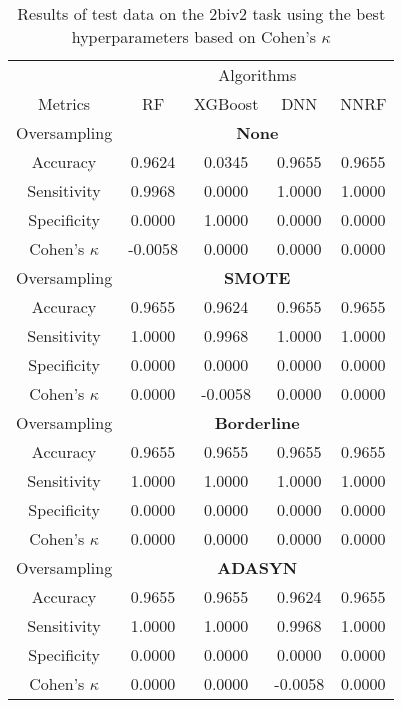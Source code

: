 \begin{table}[!htb]
\centering
\caption{Results of test data on the 2biv2 task using the best hyperparameters based on Cohen's $\kappa$}
\label{tab:2biv2_test_results}
\begin{tabular}{c | c c c c}
\hline
 & \multicolumn{4}{c}{Algorithms}\\ 
Metrics &RF & XGBoost & DNN & NNRF\\ 
\hline
Oversampling &\multicolumn{4}{|c}{\textbf{None}}\\ 
\hline
Accuracy & 0.9624 & 0.0345 & 0.9655 & 0.9655\\ 
Sensitivity & 0.9968 & 0.0000 & 1.0000 & 1.0000\\ 
Specificity & 0.0000 & 1.0000 & 0.0000 & 0.0000\\ 
Cohen's $\kappa$ & -0.0058 & 0.0000 & 0.0000 & 0.0000\\ 
\hline
Oversampling &\multicolumn{4}{|c}{\textbf{SMOTE}}\\ 
\hline
Accuracy & 0.9655 & 0.9624 & 0.9655 & 0.9655\\ 
Sensitivity & 1.0000 & 0.9968 & 1.0000 & 1.0000\\ 
Specificity & 0.0000 & 0.0000 & 0.0000 & 0.0000\\ 
Cohen's $\kappa$ & 0.0000 & -0.0058 & 0.0000 & 0.0000\\ 
\hline
Oversampling &\multicolumn{4}{|c}{\textbf{Borderline}}\\ 
\hline
Accuracy & 0.9655 & 0.9655 & 0.9655 & 0.9655\\ 
Sensitivity & 1.0000 & 1.0000 & 1.0000 & 1.0000\\ 
Specificity & 0.0000 & 0.0000 & 0.0000 & 0.0000\\ 
Cohen's $\kappa$ & 0.0000 & 0.0000 & 0.0000 & 0.0000\\ 
\hline
Oversampling &\multicolumn{4}{|c}{\textbf{ADASYN}}\\ 
\hline
Accuracy & 0.9655 & 0.9655 & 0.9624 & 0.9655\\ 
Sensitivity & 1.0000 & 1.0000 & 0.9968 & 1.0000\\ 
Specificity & 0.0000 & 0.0000 & 0.0000 & 0.0000\\ 
Cohen's $\kappa$ & 0.0000 & 0.0000 & -0.0058 & 0.0000\\ 
\hline
\end{tabular}
\end{table}

